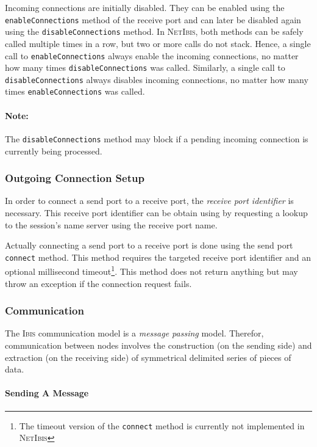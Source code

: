 \documentclass[11pt]{book}
\def\Ibis{\textsc{Ibis}\xspace}
\def\NetIbis{\textsc{NetIbis}\xspace}
\begin{document}
Incoming connections are initially disabled. They can be enabled using
the \texttt{enableConnections} method of the receive port and can
later be disabled again using the \texttt{disableConnections} method.
In \NetIbis, both methods can be safely called multiple times in a
row, but two or more calls do not stack. Hence, a single call to
\texttt{enableConnections} always enable the incoming connections, no
matter how many times \texttt{disableConnections} was called.
Similarly, a single call to \texttt{disableConnections} always
disables incoming connections, no matter how many times
\texttt{enableConnections} was called.


\paragraph{Note:}
\label{sec:note}

The \texttt{disableConnections} method may block if a pending
incoming connection is currently being processed.

%
\subsubsection{Outgoing Connection Setup}
\label{sec:outg-conn-setup}

In order to connect a send port to a receive port, the \emph{receive
  port identifier} is necessary. This receive port identifier can be
obtain using by requesting a lookup to the session's name server using
the receive port name.

Actually connecting a send port to a receive port is done using the
send port \texttt{connect} method. This method requires the targeted
receive port identifier and an optional millisecond
timeout\footnote{The timeout version of the \texttt{connect} method is
  currently not implemented in \NetIbis}. This method does not return
anything but may throw an exception if the connection request fails.

%
\subsubsection{Communication}
\label{sec:communication-1}

The \Ibis communication model is a \emph{message passing} model.
Therefor, communication between nodes involves the construction (on
the sending side) and extraction (on the receiving side) of
symmetrical delimited series of pieces of data.

\paragraph{Sending A Message}
\label{sec:sending-message}
\end{document}
